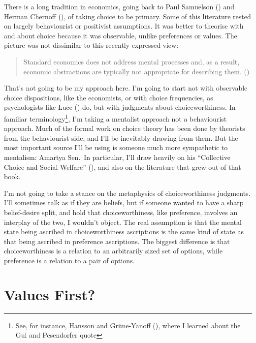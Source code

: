 \documentclass[
  11pt,
  letterpaper,
  DIV=11,
  numbers=noendperiod,
  twoside]{scrartcl}
\begin{document}
There is a long tradition in economics, going back to Paul Samuelson
() and Herman Chernoff
(), of taking choice to be primary.
Some of this literature rested on largely behaviourist or positivist
assumptions. It was better to theorise with and about choice because it
was observable, unlike preferences or values. The picture was not
dissimilar to this recently expressed view:

\begin{quote}
Standard economics does not address mental processes and, as a result,
economic abstractions are typically not appropriate for describing them.
()
\end{quote}

That's not going to be my approach here. I'm going to start not with
observable choice dispositions, like the economists, or with choice
frequencies, as psychologists like Luce ()
do, but with judgments about choiceworthiness. In familiar
terminology\footnote{See, for instance, Hansson and Grüne-Yanoff
  (), where I learned about the Gul
  and Pesendorfer quote}, I'm taking a mentalist approach not a
behaviourist approach. Much of the formal work on choice theory has been
done by theorists from the behaviourist side, and I'll be inevitably
drawing from them. But the most important source I'll be using is
someone much more sympathetic to mentalism: Amartya Sen.~In particular,
I'll draw heavily on his ``Collective Choice and Social Welfare''
(), and also on the
literature that grew out of that book.

I'm not going to take a stance on the metaphysics of choiceworthiness
judgments. I'll sometimes talk as if they are beliefs, but if someone
wanted to have a sharp belief-desire split, and hold that
choiceworthiness, like preference, involves an interplay of the two, I
wouldn't object. The real assumption is that the mental state being
ascribed in choiceworthiness ascriptions is the same kind of state as
that being ascribed in preference ascriptions. The biggest difference is
that choiceworthiness is a relation to an arbitrarily sized set of
options, while preference is a relation to a pair of options.

\section{Values First?}\label{sec-values}
\end{document}
